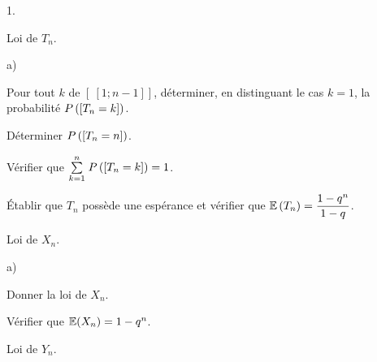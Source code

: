 \documentclass[11pt]{article}%
\begin{document}
\begin{noliste}{1.}
 \setlength{\itemsep}{4mm}
\item Loi de $T_{n}$.

\begin{noliste}{a)}
 \setlength{\itemsep}{2mm}
\item Pour tout $k$ de $\left[ \ \!\left[1;n-1\right]\!\right]$,
déterminer,
en distinguant le cas $k = 1$, la probabilité $P\left(\left[ {T_{n} =
k} \right]\right)$.
\item Déterminer $P\left(\left[ {T_{n} = n} \right]\right)$. 
\item Vérifier que ${ {\textstyle\sum\limits_{k = 1}^{n}}\hspace{.1cm}P\left(\left[ {T_{n} = k} \right]\right) = 1}$.
\item Établir que $T_{n}$ possède une espérance et vérifier que
$\mathbb{E}\left(T_{n}\right) = \dfrac{1-q^{n}}{1-q}$.
\end{noliste}
\item Loi de $X_{n}$.

\begin{noliste}{a)}
 \setlength{\itemsep}{2mm}
\item Donner la loi de $X_{n}$.
\item Vérifier que $\mathbb{E}(X_{n}) = 1-q^{n}$. 
\end{noliste}
\item Loi de $Y_{n}$.


\end{noliste}
\end{document}
